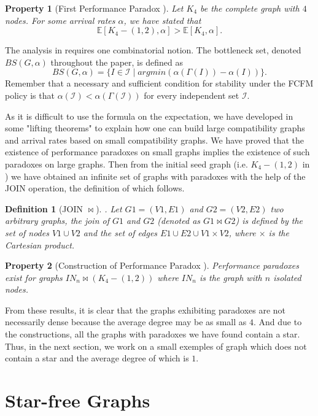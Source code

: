 \documentclass{llncs}
\newtheorem{defin}     {Definition}
\newtheorem{prop}      {Property}
\begin{document}
\begin{prop} [First Performance Paradox \cite{CDFB21}]  
Let $K_4$ be the complete graph with $4$ nodes.
For some arrival rates $\alpha$, we have stated that  $$\mathbb{E} [K_4-(1,2), \alpha]  > \mathbb{E} [K_4, \alpha] .$$ 
\end{prop}


The analysis in \cite{CDFB21} requires one combinatorial notion. The {bottleneck set}, denoted $BS(G,\alpha)$ throughout the paper, is defined as
\[
BS (G,\alpha) =\{I \in {\mathcal{I}} \mid argmin(\alpha(\Gamma(I))-\alpha(I))\}.
\]
Remember that a necessary and sufficient condition for stability 
under the FCFM policy is that $\alpha(\mathcal{I})<\alpha(\Gamma(\mathcal{I}))$ for every independent set $\mathcal{I}$.


As it is difficult to use the formula on the expectation, we have developed in \cite{BCDF24} some "lifting theorems" to
explain how one can build large compatibility graphs and arrival rates based on small compatibility graphs. We have 
proved that the existence of performance paradoxes on small graphs implies the existence of such paradoxes 
on large graphs. Then from the initial seed graph (i.e. $K_4-(1,2)$ in \cite{CDFB21}) 
we have obtained an infinite set of graphs with paradoxes with the help of the JOIN operation, the definition of which follows. 
\begin{defin} [JOIN $\bowtie$]. Let $G1=(V1,E1) $ and  $G2=(V2,E2) $ two arbitrary graphs, 
the join of $G1$ and $G2$ (denoted as $G1 \bowtie G2$) is defined by the set of nodes $V1 \cup V2$ and the set 
of edges $E1 \cup E2 \cup V1 \times V2$, where $\times $ is the Cartesian product.  
\end{defin} 
 \begin{prop} [Construction of Performance Paradox \cite{BCDF24}]  
Performance paradoxes exist for graphs $IN_n \bowtie (K_4 -(1,2)) $ where $ IN_n$ is the graph with $n$ isolated nodes.   
\end{prop}

From these results, it is clear that the graphs exhibiting paradoxes are not necessarily dense because 
the average degree may be as small as $4$. And due to the constructions, all the graphs with paradoxes we have found 
contain a star. Thus, in the next section, we work on a small exemples of graph which does not contain a star and
the average degree of which is $1$.  
  
\section{Star-free Graphs}
\end{document}
